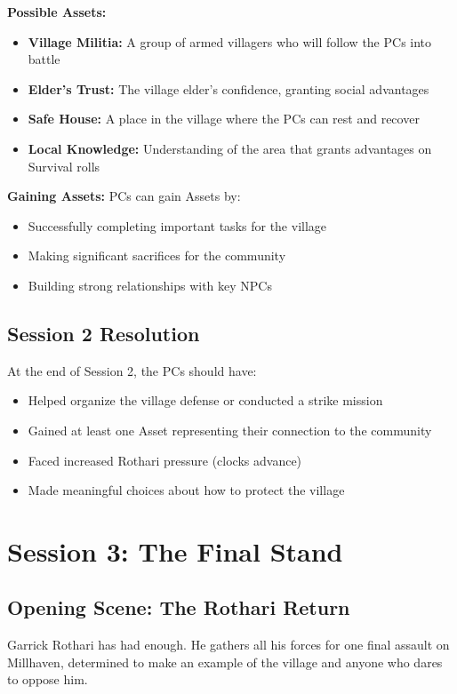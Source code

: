 \documentclass[11pt]{article}
\begin{document}
\textbf{Possible Assets:}
\begin{itemize}
\item \textbf{Village Militia:} A group of armed villagers who will follow the PCs into battle
\item \textbf{Elder's Trust:} The village elder's confidence, granting social advantages
\item \textbf{Safe House:} A place in the village where the PCs can rest and recover
\item \textbf{Local Knowledge:} Understanding of the area that grants advantages on Survival rolls
\end{itemize}

\textbf{Gaining Assets:} PCs can gain Assets by:
\begin{itemize}
\item Successfully completing important tasks for the village
\item Making significant sacrifices for the community
\item Building strong relationships with key NPCs
\end{itemize}

\subsection{Session 2 Resolution}

At the end of Session 2, the PCs should have:
\begin{itemize}
\item Helped organize the village defense or conducted a strike mission
\item Gained at least one Asset representing their connection to the community
\item Faced increased Rothari pressure (clocks advance)
\item Made meaningful choices about how to protect the village
\end{itemize}

\section{Session 3: The Final Stand}

\subsection{Opening Scene: The Rothari Return}

Garrick Rothari has had enough. He gathers all his forces for one final assault on Millhaven, determined to make an example of the village and anyone who dares to oppose him.
\end{document}
